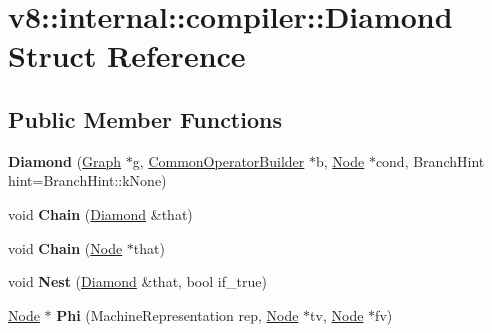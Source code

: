 \hypertarget{structv8_1_1internal_1_1compiler_1_1_diamond}{}\section{v8\+:\+:internal\+:\+:compiler\+:\+:Diamond Struct Reference}
\label{structv8_1_1internal_1_1compiler_1_1_diamond}
\subsection*{Public Member Functions}
\begin{DoxyCompactItemize}
\item 
{\bfseries Diamond} (\hyperlink{classv8_1_1internal_1_1compiler_1_1_graph}{Graph} $\ast$g, \hyperlink{classv8_1_1internal_1_1compiler_1_1_common_operator_builder}{Common\+Operator\+Builder} $\ast$b, \hyperlink{classv8_1_1internal_1_1compiler_1_1_node}{Node} $\ast$cond, Branch\+Hint hint=Branch\+Hint\+::k\+None)\hypertarget{structv8_1_1internal_1_1compiler_1_1_diamond_a8b900971f8721586bd23a50ed1858a2a}{}\label{structv8_1_1internal_1_1compiler_1_1_diamond_a8b900971f8721586bd23a50ed1858a2a}

\item 
void {\bfseries Chain} (\hyperlink{structv8_1_1internal_1_1compiler_1_1_diamond}{Diamond} \&that)\hypertarget{structv8_1_1internal_1_1compiler_1_1_diamond_a939e06d79071c730a3b5495375f3eb5e}{}\label{structv8_1_1internal_1_1compiler_1_1_diamond_a939e06d79071c730a3b5495375f3eb5e}

\item 
void {\bfseries Chain} (\hyperlink{classv8_1_1internal_1_1compiler_1_1_node}{Node} $\ast$that)\hypertarget{structv8_1_1internal_1_1compiler_1_1_diamond_add0e555d42c3af29a0ebd034a3626f5c}{}\label{structv8_1_1internal_1_1compiler_1_1_diamond_add0e555d42c3af29a0ebd034a3626f5c}

\item 
void {\bfseries Nest} (\hyperlink{structv8_1_1internal_1_1compiler_1_1_diamond}{Diamond} \&that, bool if\+\_\+true)\hypertarget{structv8_1_1internal_1_1compiler_1_1_diamond_acf1472476c08f7e6e577f87e887a3e3e}{}\label{structv8_1_1internal_1_1compiler_1_1_diamond_acf1472476c08f7e6e577f87e887a3e3e}

\item 
\hyperlink{classv8_1_1internal_1_1compiler_1_1_node}{Node} $\ast$ {\bfseries Phi} (Machine\+Representation rep, \hyperlink{classv8_1_1internal_1_1compiler_1_1_node}{Node} $\ast$tv, \hyperlink{classv8_1_1internal_1_1compiler_1_1_node}{Node} $\ast$fv)\hypertarget{structv8_1_1internal_1_1compiler_1_1_diamond_a127ef026a0c3a27b220f400493d790f4}{}\label{structv8_1_1internal_1_1compiler_1_1_diamond_a127ef026a0c3a27b220f400493d790f4}

\end{DoxyCompactItemize}
